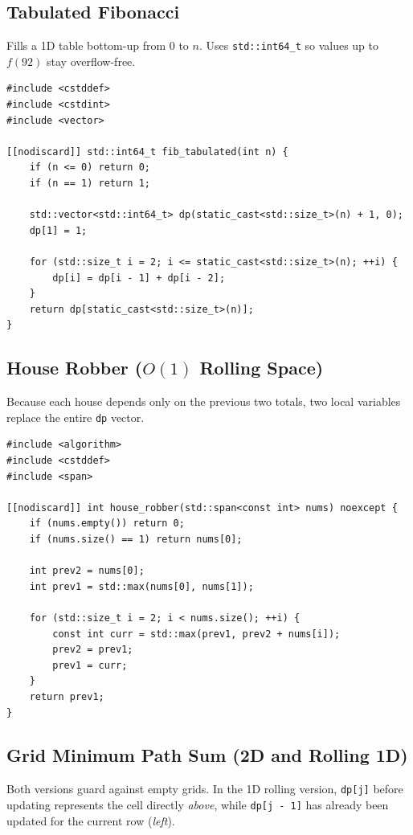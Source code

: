 \documentclass[11pt,a4paper]{article}
\theoremstyle{definition}
\begin{document}
\subsection{Tabulated Fibonacci}
Fills a 1D table bottom-up from $0$ to $n$. Uses \texttt{std::int64\_t} so values up to $f(92)$ stay overflow-free.

\begin{lstlisting}[caption={Fibonacci with bottom-up tabulation}]
#include <cstddef>
#include <cstdint>
#include <vector>

[[nodiscard]] std::int64_t fib_tabulated(int n) {
    if (n <= 0) return 0;
    if (n == 1) return 1;

    std::vector<std::int64_t> dp(static_cast<std::size_t>(n) + 1, 0);
    dp[1] = 1;

    for (std::size_t i = 2; i <= static_cast<std::size_t>(n); ++i) {
        dp[i] = dp[i - 1] + dp[i - 2];
    }
    return dp[static_cast<std::size_t>(n)];
}
\end{lstlisting}

\subsection{House Robber (\texorpdfstring{$O(1)$}{O(1)} Rolling Space)}
Because each house depends only on the previous two totals, two local variables replace the entire \texttt{dp} vector.

\begin{lstlisting}[caption={House Robber optimized to $O(1)$ auxiliary space}]
#include <algorithm>
#include <cstddef>
#include <span>

[[nodiscard]] int house_robber(std::span<const int> nums) noexcept {
    if (nums.empty()) return 0;
    if (nums.size() == 1) return nums[0];

    int prev2 = nums[0];
    int prev1 = std::max(nums[0], nums[1]);

    for (std::size_t i = 2; i < nums.size(); ++i) {
        const int curr = std::max(prev1, prev2 + nums[i]);
        prev2 = prev1;
        prev1 = curr;
    }
    return prev1;
}
\end{lstlisting}

\subsection{Grid Minimum Path Sum (2D and Rolling 1D)}
Both versions guard against empty grids. In the 1D rolling version, \texttt{dp[j]} before updating represents the cell directly \emph{above}, while \texttt{dp[j - 1]} has already been updated for the current row (\emph{left}).
\end{document}
